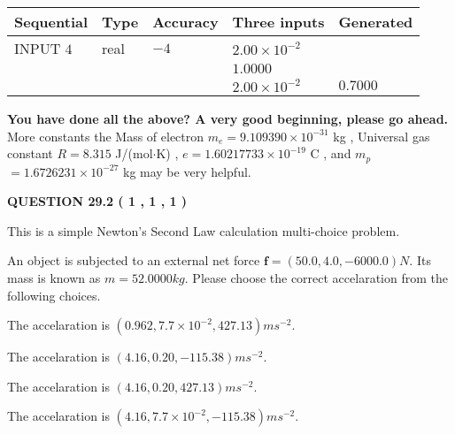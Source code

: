 \documentclass[12pt]{article}
\begin{document}
   
  
  
\noindent\begin{tabular}{|l|l|l|l|l|}
\hline
 Sequential & Type & Accuracy & Three inputs & Generated \\ 
\hline
 
 
  INPUT $            4 $ & real & $           -4  $ & $
 2.00 \times 10^{-2}
  $ & \\
  & & &  $
 1.0000
  $ & \\
  & & &  $
 2.00 \times 10^{-2}
 $ & $ 0.7000 $ 
 \\  \hline  
 \end{tabular}
   
   
   
   
\vspace{0.3in}
{\textbf{\LARGE{You have done all the above? A very good beginning, please go ahead.}}}
More constants the
Mass of electron
$m_e$$ =
9.109390 \times 10^{-31} $
kg
,
Universal gas constant
$R$$ =
8.315 $
J/(mol$\cdot $K)
,
$e$$ =
1.60217733 \times 10^{-19} $
C
, and
$m_p$$ =
1.6726231 \times 10^{-27} $
kg
%
may be very helpful.
\vspace{0.3in}
   
   
  
\vspace{0.2in}
  
{\textbf{\Large{QUESTION
29.2 
 (           1 ,           1 ,           1 )
}}}
  
  


\noindent{}
This is a simple Newton's Second Law calculation multi-choice problem.  
\noindent{}


 
 
An object is subjected to an external net force $\mathbf{f}=
(50.0 , 4.0 , -6000.0) N$.
Its mass is known as $m= %
52.0000 kg$. Please choose the
correct accelaration from the following choices.
 
 
 
The accelaration is $  %
(
0.962,
7.7 \times 10^{-2},
427.13)
ms^{-2} $.
 
 
The accelaration is $  %
(
4.16,
0.20,
-115.38)
ms^{-2} $.
 
 
The accelaration is $  %
(
4.16,
0.20,
427.13)
ms^{-2} $.
 
 
The accelaration is $  %
(
4.16,
7.7 \times 10^{-2},
-115.38)
ms^{-2} $.
 
\end{document}
